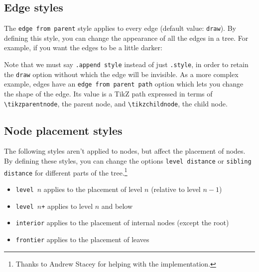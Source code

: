\documentclass{article}
\begin{document}
\subsection{Edge styles}

The \verb|edge from parent| style applies to every edge (default value: \verb|draw|). By defining this style, you can change the appearance of all the edges in a tree. For example, if you want the edges to be a little darker:
\begin{center}
\begin{SideBySideExample}
\end{SideBySideExample}
\end{center}
Note that we must say \verb|.append style| instead of just \verb|.style|, in order to retain the \verb|draw| option without which the edge will be invisible.
As a more complex example, edges have an
\verb|edge from parent path| option which lets you change the shape of
the edge. Its value is a TikZ path expressed in terms of
\verb|\tikzparentnode|, the parent node, and \verb|\tikzchildnode|,
the child node.
\begin{center}
\begin{SideBySideExample}
\end{SideBySideExample}
\end{center}

\subsection{Node placement styles}

The following styles aren't applied to nodes, but affect the placement of nodes. By defining these styles, you can change the options \verb|level distance| or \verb|sibling distance| for different parts of the tree.\footnote{Thanks to Andrew Stacey for helping with the implementation.}
\begin{itemize}
\item \texttt{level $n$} applies to the placement of level $n$ (relative to level $n-1$)
\item \texttt{level $n$+} applies to level $n$ and below
\item \verb|interior| applies to the placement of internal nodes (except the root)
\item \verb|frontier| applies to the placement of leaves
\end{itemize}
\end{document}

